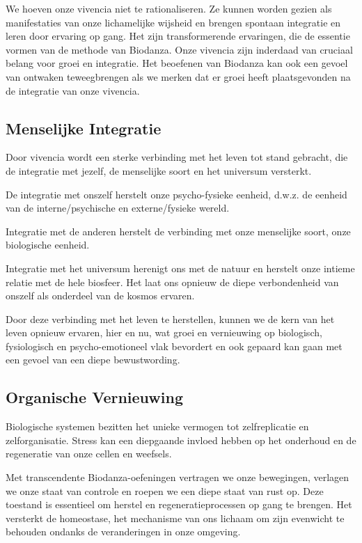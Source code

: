 \documentclass[
  11pt,
]{book}
\begin{document}
We hoeven onze vivencia niet te rationaliseren. Ze kunnen worden gezien als manifestaties van onze lichamelijke wijsheid en brengen spontaan integratie en leren door ervaring op gang. Het zijn transformerende ervaringen, die de essentie vormen van de methode van Biodanza. Onze vivencia zijn inderdaad van cruciaal belang voor groei en integratie. Het beoefenen van Biodanza kan ook een gevoel van ontwaken teweegbrengen als we merken dat er groei heeft plaatsgevonden na de integratie van onze vivencia.

\subsection{Menselijke Integratie}\label{menselijke-integratie}

Door vivencia wordt een sterke verbinding met het leven tot stand gebracht, die de integratie met jezelf, de menselijke soort en het universum versterkt.

De integratie met onszelf herstelt onze psycho-fysieke eenheid, d.w.z. de eenheid van de interne/psychische en externe/fysieke wereld.

Integratie met de anderen herstelt de verbinding met onze menselijke soort, onze biologische eenheid.

Integratie met het universum herenigt ons met de natuur en herstelt onze intieme relatie met de hele biosfeer. Het laat ons opnieuw de diepe verbondenheid van onszelf als onderdeel van de kosmos ervaren.

Door deze verbinding met het leven te herstellen, kunnen we de kern van het leven opnieuw ervaren, hier en nu, wat groei en vernieuwing op biologisch, fysiologisch en psycho-emotioneel vlak bevordert en ook gepaard kan gaan met een gevoel van een diepe bewustwording.

\subsection{Organische Vernieuwing}\label{organische-vernieuwing}

Biologische systemen bezitten het unieke vermogen tot zelfreplicatie en zelforganisatie. Stress kan een diepgaande invloed hebben op het onderhoud en de regeneratie van onze cellen en weefsels.

Met transcendente Biodanza-oefeningen vertragen we onze bewegingen, verlagen we onze staat van controle en roepen we een diepe staat van rust op. Deze toestand is essentieel om herstel en regeneratieprocessen op gang te brengen. Het versterkt de homeostase, het mechanisme van ons lichaam om zijn evenwicht te behouden ondanks de veranderingen in onze omgeving.
\end{document}
